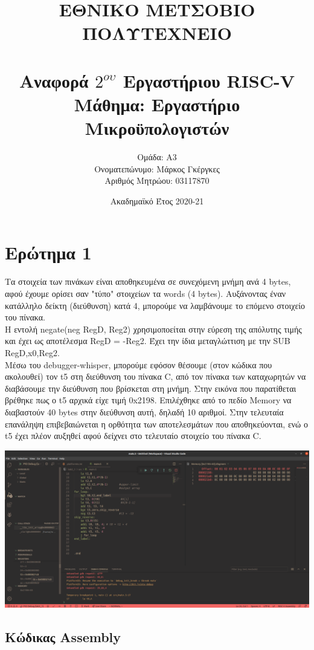 \documentclass[a4paper]{article}
\title{ΕΘΝΙΚΟ ΜΕΤΣΟΒΙΟ ΠΟΛΥΤΕΧΝΕΙΟ\\ ~\\Αναφορά $2^{ου}$ Εργαστήριου RISC-V\\Μάθημα: Εργαστήριο Μικροϋπολογιστών}
\author{Ομάδα: Α3 \\Ονοματεπώνυμο: Μάρκος Γκέργκες\\ Αριθμός Μητρώου: 03117870}
\date{Ακαδημαϊκό Έτος 2020-21 }
\begin{document}
\maketitle

\section*{Ερώτημα 1}
\par  Tα στοιχεία των πινάκων είναι αποθηκευμένα σε συνεχόμενη μνήμη ανά 4 bytes, αφού έχουμε ορίσει σαν "τύπο" στοιχείων 
τα words (4 bytes). Αυξάνοντας έναν κατάλληλο δείκτη (διεύθυνση) κατά 4, μπορούμε να λαμβάνουμε το επόμενο στοιχείο του πίνακα.
\\Η εντολή negate(neg RegD, Reg2) χρησιμοποείται στην εύρεση της απόλυτης τιμής και έχει ως αποτέλεσμα RegD = -Reg2. Έχει την ίδια μεταγλώττιση με την SUB   RegD,x0,Reg2.
\\Μέσω του debugger-whisper, μπορούμε εφόσον θέσουμε (στον κώδικα που ακολουθεί) τον t5 στη διεύθυνση του πίνακα C, από τον πίνακα των καταχωρητών να διαβάσουμε την διεύθυνση 
που βρίσκεται στη μνήμη. Στην εικόνα που παρατίθεται βρέθηκε πως ο t5 αρχικά είχε τιμή 0x2198. Επιλέχθηκε από το πεδίο Memory να διαβαστούν 40 bytes στην διεύθυνση αυτή, δηλαδή 
10 αριθμοί. Στην τελευταία επανάληψη επιβεβαιώνεται η ορθότητα των αποτελεσμάτων που αποθηκεύονται, ενώ ο t5 έχει πλέον αυξηθεί αφού δείχνει στο τελευταίο στοιχείο του πίνακα C.

\vspace{\baselineskip}
\vspace{\baselineskip}

\includegraphics[width=1\linewidth]{Screenshot_riscv}

\pagebreak
\subsection*{Κώδικας Assembly}
\end{document}

